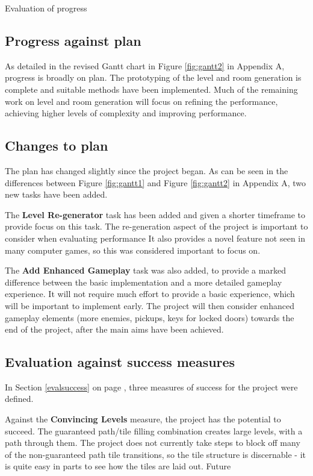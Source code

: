 \documentclass[progress]{cmpreport}
\begin{document}
\begin{section}{Evaluation of progress}

\subsection{Progress against plan}
As detailed in the revised Gantt chart in Figure \ref{fig:gantt2} in Appendix A, progress is broadly on plan. The prototyping of the level and room generation is complete and suitable methods have been implemented. Much of the remaining work on level and room generation will focus on refining the performance, achieving higher levels of complexity and improving performance.

\subsection{Changes to plan}
The plan has changed slightly since the project began. As can be seen in the differences between Figure \ref{fig:gantt1} and Figure \ref{fig:gantt2} in Appendix A, two new tasks have been added.

The \textbf{Level Re-generator} task has been added and given a shorter timeframe to provide focus on this task. The re-generation aspect of the project is important to consider when evaluating performance It also provides a novel feature not seen in many computer games, so this was considered important to focus on.

The \textbf{Add Enhanced Gameplay} task was also added, to provide a marked difference between the basic implementation and a more detailed gameplay experience. It will not require much effort to provide a basic experience, which will be important to implement early. The project will then consider enhanced gameplay elements (more enemies, pickups, keys for locked doors) towards the end of the project, after the main aims have been achieved.

\subsection{Evaluation against success measures}
In Section \ref{evalsuccess} on page \pageref{evalsuccess}, three measures of success for the project were defined. 

Against the \textbf{Convincing Levels} measure, the project has the potential to succeed. The guaranteed path/tile filling combination creates large levels, with a path through them. The project does not currently take steps to block off many of the non-guaranteed path tile transitions, so the tile structure is discernable - it is quite easy in parts to see how the tiles are laid out. Future 


\end{section}
\end{document}
